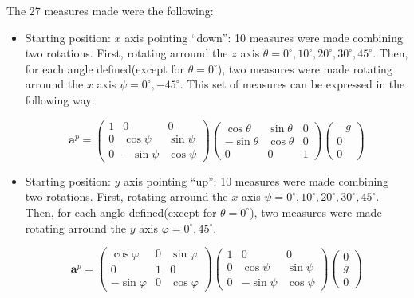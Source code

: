 \documentclass[conference]{IEEEtran}
\begin{document}
The 27 measures made were the following:
\begin{itemize}
\item Starting position: $x$ axis pointing ``down'': 10 measures were made combining two rotations. First, rotating arround the $z$ axis $\theta =0^\circ, 10^\circ, 20^\circ, 30^\circ, 45^\circ$. Then, for each angle defined(except for $\theta = 0^\circ$), two measures were made rotating arround the $x$ axis $\psi = 0^\circ, -45^\circ$. This set of measures can be expressed in the following way:
\begin{scriptsize}
\begin{equation}
\mathbf{a}^p = \left(\begin{array}{ccc}
1 & 0 & 0\\
0 & \cos \psi & \sin \psi \\
0 & -\sin \psi & \cos \psi
\end{array}\right)\left(\begin{array}{ccc}
\cos \theta & \sin \theta & 0\\
-\sin \theta & \cos \theta & 0\\
0 & 0 & 1
\end{array}\right)\left(\begin{array}{c}
-g\\
0\\
0
\end{array}\right)
\label{eq:acc_x}
\end{equation}
\end{scriptsize}
 

\item Starting position: $y$ axis pointing ``up'': 10 measures were made combining two rotations. First, rotating arround the $x$ axis $\psi =0^\circ, 10^\circ, 20^\circ, 30^\circ, 45^\circ$. Then, for each angle defined(except for $\theta = 0^\circ$), two measures were made rotating arround the $y$ axis $\varphi = 0^\circ, 45^\circ$.   

\begin{scriptsize}
\begin{equation}
\mathbf{a}^p = \left(\begin{array}{ccc}
\cos \varphi & 0 &\sin \varphi\\
0 & 1 & 0\\
-\sin \varphi & 0 & \cos \varphi
\end{array}\right)\left(\begin{array}{ccc}
1 & 0 & 0\\
0 & \cos \psi & \sin \psi \\
0 & -\sin \psi & \cos \psi
\end{array}\right)\left(\begin{array}{c}
0\\
g\\
0
\end{array}\right)
\label{eq:acc_y}
\end{equation}
\end{scriptsize}


\end{itemize}
\end{document}
